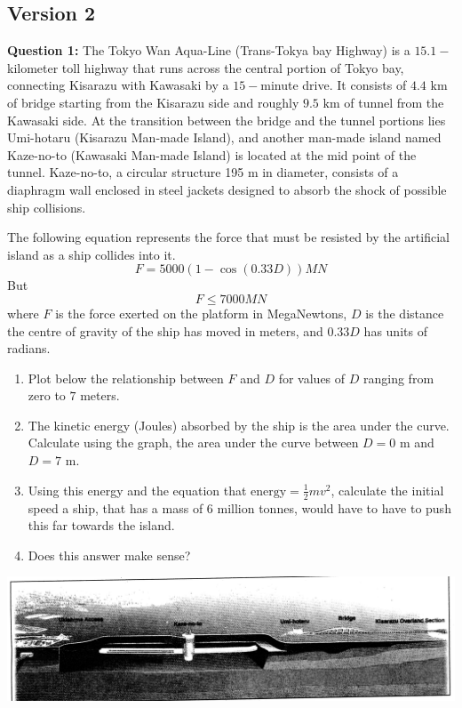 \documentclass{article}
\begin{document}
\newpage
\subsection*{Version 2}
\textbf{Question 1:} The Tokyo Wan Aqua-Line (Trans-Tokya bay Highway) is a $15.1-$kilometer toll highway that runs across the central portion of Tokyo bay, connecting Kisarazu with Kawasaki by a $15-$minute drive. It consists of $4.4 \text{ km}$ of bridge starting from the Kisarazu side and roughly $9.5 \text{ km}$ of tunnel from the Kawasaki side. At the transition between the bridge and the tunnel portions lies Umi-hotaru (Kisarazu Man-made Island), and another man-made island named Kaze-no-to (Kawasaki Man-made Island) is located at the mid point of the tunnel. Kaze-no-to, a circular structure 195 m in diameter, consists of a diaphragm wall enclosed in steel jackets designed to absorb the shock of possible ship collisions.

The following equation represents the force that must be resisted by the artificial island as a ship collides into it.
$$F=5000(1-\cos(0.33D)) MN$$
But
$$F \le 7000 MN$$
where $F$ is the force exerted on the platform in MegaNewtons, $D$ is the distance the centre of gravity of the ship has moved in meters, and $0.33D$ has units of radians.
\begin{enumerate}
    \item Plot below the relationship between $F$ and $D$ for values of $D$ ranging from zero to $7$ meters.
    \item The kinetic energy (Joules) absorbed by the ship is the area under the curve. Calculate using the graph, the area under the curve between $D=0 \text{ m}$ and $D=7\text{ m}$.
    \item Using this energy and the equation that $\text{energy}=\frac{1}{2}mv^2$, calculate the initial speed a ship, that has a mass of 6 million tonnes, would have to have to push this far towards the island.
    \item Does this answer make sense?
\end{enumerate}
\begin{center}
    \includegraphics[width=0.8\linewidth]{2011-2-1.png}
\end{center}
\end{document}
